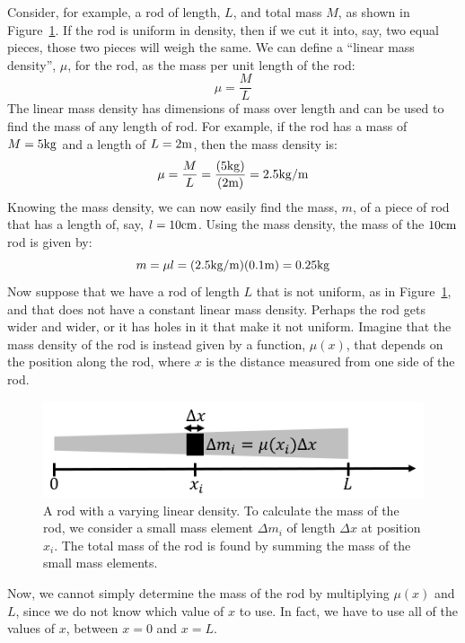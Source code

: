 Consider, for example, a rod of length, $L$, and total mass $M$, as shown in Figure~\ref{fig:Calculus:rod}. If the rod is uniform in density, then if we cut it into, say, two equal pieces, those two pieces will weigh the same. We can define a ``linear mass density'', $\mu$, for the rod, as the mass per unit length of the rod:
\begin{equation}
\mu = \frac{M}{L}
\end{equation}
The linear mass density has dimensions of mass over length and can be used to find the mass of any length of rod. For example, if the rod has a mass of $M=5 {\rm kg}$ and a length of $L=2 {\rm m}$, then the mass density is:
\begin{equation}
\mu=\frac{M}{L}=\frac{(5 {\rm kg})}{(2 {\rm m})}=2.5 {\rm kg/m}
\end{equation}
Knowing the mass density, we can now easily find the mass, $m$, of a piece of rod that has a length of, say, $l=10 {\rm cm}$. Using the mass density, the mass of the $10 {\rm cm}$ rod is given by:
\begin{equation}
m=\mu l=(2.5 {\rm kg/m})(0.1 {\rm m})=0.25 {\rm kg}
\end{equation}
Now suppose that we have a rod of length $L$ that is not uniform, as in Figure~\ref{fig:Calculus:rod}, and that does not have a constant linear mass density. Perhaps the rod gets wider and wider, or it has holes in it that make it not uniform. Imagine that the mass density of the rod is instead given by a function, $\mu(x)$, that depends on the position along the rod, where $x$ is the distance measured from one side of the rod.

\begin{figure}[!htbp]
\centering
\includegraphics[width=0.7\linewidth]{files/rod-59833f0247eca084126948bbbd21f631.png}
\caption[]{A rod with a varying linear density. To calculate the mass of the rod, we consider a small mass element $\Delta m_i$ of length $\Delta x$ at position $x_i$. The total mass of the rod is found by summing the mass of the small mass elements.}
\label{fig:Calculus:rod}
\end{figure}

Now, we cannot simply determine the mass of the rod by multiplying $\mu(x)$ and $L$, since we do not know which value of $x$ to use. In fact, we have to use all of the values of $x$, between $x=0$ and $x=L$.

